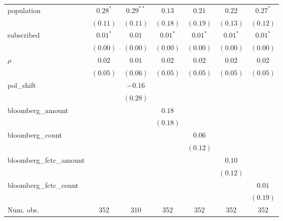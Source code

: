 \begin{table}[!h]
\begin{center}
\begin{tabular}{l c c c c c c }
population              & $0.28^{*}$   & $0.29^{**}$  & $0.13$       & $0.21$       & $0.22$       & $0.27^{*}$   \\
                        & $(0.11)$     & $(0.11)$     & $(0.18)$     & $(0.19)$     & $(0.13)$     & $(0.12)$     \\
subscribed              & $0.01^{*}$   & $0.01$       & $0.01^{*}$   & $0.01^{*}$   & $0.01^{*}$   & $0.01^{*}$   \\
                        & $(0.00)$     & $(0.00)$     & $(0.00)$     & $(0.00)$     & $(0.00)$     & $(0.00)$     \\
$\rho$                  & $0.02$       & $0.01$       & $0.02$       & $0.02$       & $0.02$       & $0.02$       \\
                        & $(0.05)$     & $(0.06)$     & $(0.05)$     & $(0.05)$     & $(0.05)$     & $(0.05)$     \\
pol\_shift              &              & $-0.16$      &              &              &              &              \\
                        &              & $(0.28)$     &              &              &              &              \\
bloomberg\_amount       &              &              & $0.18$       &              &              &              \\
                        &              &              & $(0.18)$     &              &              &              \\
bloomberg\_count        &              &              &              & $0.06$       &              &              \\
                        &              &              &              & $(0.12)$     &              &              \\
bloomberg\_fctc\_amount &              &              &              &              & $0.10$       &              \\
                        &              &              &              &              & $(0.12)$     &              \\
bloomberg\_fctc\_count  &              &              &              &              &              & $0.01$       \\
                        &              &              &              &              &              & $(0.19)$     \\
\midrule
Num. obs.               & 352          & 310          & 352          & 352          & 352          & 352          \\

\end{tabular}
\end{center}
\end{table}

